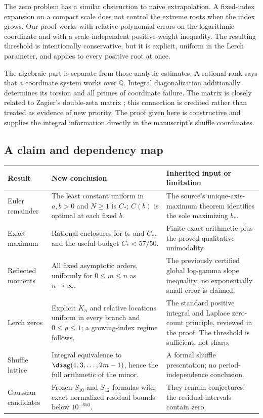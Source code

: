 The zero problem has a similar obstruction to naive extrapolation. A
fixed-index expansion on a compact scale does not control the extreme
roots when the index grows. Our proof works with relative polynomial
errors on the logarithmic coordinate and with a scale-independent
positive-weight inequality. The resulting threshold is intentionally
conservative, but it is explicit, uniform in the Lerch parameter, and
applies to every positive root at once.

The algebraic part is separate from those analytic estimates. A rational
rank says that a coordinate system works over $\mathbb Q$. Integral
diagonalization additionally determines its torsion and all primes of
coordinate failure. The matrix is closely related to Zagier's double-zeta
matrix \cite{Zagier,Ma,MaTeo}; this connection is credited rather than
treated as evidence of new priority. The proof given here is constructive
and supplies the integral information directly in the manuscript's
shuffle coordinates.

\subsection{A claim and dependency map}

\begin{longtable}{@{}P{0.19\textwidth}P{0.46\textwidth}P{0.29\textwidth}@{}}
\toprule
Result & New conclusion & Inherited input or limitation\\
\midrule
\endhead
Euler remainder & The least constant uniform in $a,b>0$ and $N\ge1$ is
$C_*$; $C(b)$ is optimal at each fixed $b$. & The source's unique-axis-maximum
theorem identifies the sole maximizing $b_*$.\\
Exact maximum & Rational enclosures for $b_*$ and $C_*$, and the useful
budget $C_*<57/50$. & Finite exact arithmetic plus the proved qualitative
unimodality.\\
Reflected moments & All fixed asymptotic orders, uniformly for
$0\le m\le n$ as $n\to\infty$. & The previously certified global
log-gamma slope inequality; no exponentially small error is claimed.\\
Lerch zeros & Explicit $K_n$ and relative locations uniform in every
branch and $0\le\rho\le1$; a growing-index regime follows. & The
standard positive integral and Laplace zero-count principle, reviewed
in the proof. The threshold is sufficient, not sharp.\\
Shuffle lattice & Integral equivalence to
$\diag(1,3,\ldots,2m-1)$, hence the full arithmetic of the minor. & A
formal shuffle presentation; no period-independence conclusion.\\
Gaussian candidates & Frozen $S_{10}$ and $S_{12}$ formulas with exact
normalized residual bounds below $10^{-650}$. & They remain conjectures;
the residual intervals contain zero.\\
\bottomrule
\end{longtable}

